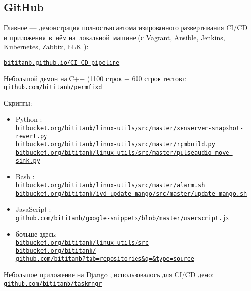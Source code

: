 \documentclass[11pt, a4paper]{article}
\newcommand{\Delimitline}{
  \vspace{-2ex}
  \noindent\makebox[\linewidth]{\rule{\DelimitlineLength}{0.12ex}} }
\newcommand\rurl[1]{%
  \-\hspace{0.5em}
  \href{http://#1}{\nolinkurl{#1}}%
}
\newcommand\Eng[1]{%
  \foreignlanguage{english}{#1}%
}
\begin{document}

\subsection*{GitHub}
\Delimitline

Главное — демонстрация полностью автоматизированного развертывания \Eng{CI/CD} и приложения~в~нём на~локальной~машине
(с \Eng{Vagrant, Ansible, Jenkins, Kubernetes, Zabbix, ELK}):\\
\vspace{0.4ex}
  {
  \rurl{bititanb.github.io/CI-CD-pipeline}
  }
  
\vspace{2.5ex}

Небольшой демон на \Eng{C++} (1100 строк + 600 строк тестов):\\
\vspace{0.4ex}
  \rurl{github.com/bititanb/permfixd}
  
Скрипты:
\begin{itemize}
  \item \Eng{Python}:\\
    \vspace{0.2ex}
    \rurl{bitbucket.org/bititanb/linux-utils/src/master/xenserver-snapshot-revert.py}\\
    \rurl{bitbucket.org/bititanb/linux-utils/src/master/rpmbuild.py}\\
    \rurl{bitbucket.org/bititanb/linux-utils/src/master/pulseaudio-move-sink.py}
  \item \Eng{Bash}:\\
    \vspace{0.2ex}
    \rurl{bitbucket.org/bititanb/linux-utils/src/master/alarm.sh}\\
    \rurl{bitbucket.org/bititanb/ivd-update-mango/src/master/update-mango.sh}
  \item \Eng{JavaScript}:\\
    \vspace{0.2ex}
    \rurl{github.com/bititanb/google-snippets/blob/master/userscript.js}
  \item больше здесь:\\
    \vspace{0.2ex}
    \rurl{bitbucket.org/bititanb/linux-utils/src}\\
    \rurl{bitbucket.org/bititanb/}\\
    \rurl{github.com/bititanb?tab=repositories&q=&type=source}
\end{itemize}
Небольшое приложение на \Eng{Django}, использовалось для \href{https://github.com/bititanb/CI-CD-pipeline}{\Eng{CI/CD} демо}:\\
\vspace{0.4ex}
  \rurl{github.com/bititanb/taskmngr}
\end{document}
